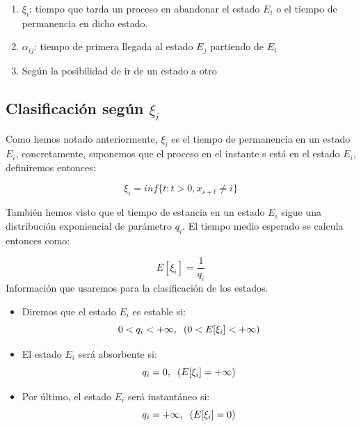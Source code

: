 \documentclass[12pt,a4paper]{article}
\begin{document}
	\begin{enumerate}
		\item $\xi_{i}$: tiempo que tarda un proceso en abandonar el estado $E_{i}$ o el tiempo de permanencia en dicho estado.
		\item $\alpha_{ij}$: tiempo de primera llegada al estado $E_{j}$ partiendo de $E_{i}$
		\item Según la posibilidad de ir de un estado a otro
	\end{enumerate}
		

\subsection{Clasificación según \textbf{$\xi_{i}$}}
 Como hemos notado anteriormente, $\xi_{i}$ es el tiempo de permanencia en un estado $E_{i}$, concretamente, suponemos que el proceso en el instante s está en el estado $E_{i}$, definiremos entonces:

\begin{equation*}
	\xi_{i}=inf \{ t:t > 0, x_{s+t}\neq i \}
\end{equation*}

También hemos visto que el tiempo de estancia en un estado $E_{i}$ sigue una distribución exponiencial de parámetro $q_{i}$. El tiempo medio esperado se calcula entonces como: 

\begin{equation*}
E[\xi_{i}]= \frac{1}{q_{i}}
\end{equation*}
Información que usaremos para la clasificación de los estados.
\\


\begin{itemize}
	\item Diremos que el estado $E_{i}$ es estable si:
	 \begin{equation*}
	 	0< q_{i} < +\infty, \hspace{0.2cm} (0<E[\xi_{i}]<+\infty) 
	 \end{equation*}
    \item El estado $E_{i}$ será absorbente si:
        \begin{equation*}
    	q_{i}=0, \hspace{0.2cm} (E[\xi_{i}]=+\infty)
        \end{equation*} 
     \item Por último, el estado  $E_{i}$ será instantáneo si:  
      \begin{equation*}
      	q_{i}=+\infty, \hspace{0.2cm} (E[\xi_{i}]=0)
      \end{equation*}
      
\end{itemize}
\end{document}
